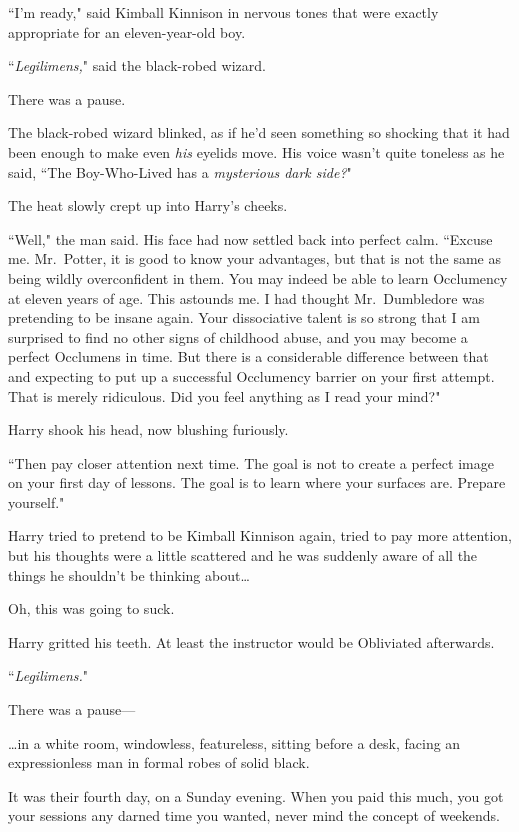 ``I'm ready," said Kimball Kinnison in nervous tones that were exactly appropriate for an eleven-year-old boy.

``\emph{Legilimens,}" said the black-robed wizard.

There was a pause.

The black-robed wizard blinked, as if he'd seen something so shocking that it had been enough to make even \emph{his} eyelids move. His voice wasn't quite toneless as he said, ``The Boy-Who-Lived has a \emph{mysterious dark side?}"

The heat slowly crept up into Harry's cheeks.

``Well," the man said. His face had now settled back into perfect calm. ``Excuse me. Mr.~Potter, it is good to know your advantages, but that is not the same as being wildly overconfident in them. You may indeed be able to learn Occlumency at eleven years of age. This astounds me. I had thought Mr.~Dumbledore was pretending to be insane again. Your dissociative talent is so strong that I am surprised to find no other signs of childhood abuse, and you may become a perfect Occlumens in time. But there is a considerable difference between that and expecting to put up a successful Occlumency barrier on your first attempt. That is merely ridiculous. Did you feel anything as I read your mind?"

Harry shook his head, now blushing furiously.

``Then pay closer attention next time. The goal is not to create a perfect image on your first day of lessons. The goal is to learn where your surfaces are. Prepare yourself."

Harry tried to pretend to be Kimball Kinnison again, tried to pay more attention, but his thoughts were a little scattered and he was suddenly aware of all the things he shouldn't be thinking about{\ldots}

Oh, this was going to suck.

Harry gritted his teeth. At least the instructor would be Obliviated afterwards.

``\emph{Legilimens.}"

There was a pause—

\later

{\ldots}in a white room, windowless, featureless, sitting before a desk, facing an expressionless man in formal robes of solid black.

It was their fourth day, on a Sunday evening. When you paid this much, you got your sessions any darned time you wanted, never mind the concept of weekends.

